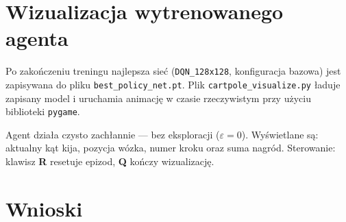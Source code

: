 \documentclass[12pt,a4paper]{article}
\begin{document}
\section{Wizualizacja wytrenowanego agenta}

Po zakończeniu treningu najlepsza sieć (\texttt{DQN\_128x128}, konfiguracja bazowa)
jest zapisywana do pliku \texttt{best\_policy\_net.pt}.
Plik \texttt{cartpole\_visualize.py} ładuje zapisany model i uruchamia
animację w czasie rzeczywistym przy użyciu biblioteki \texttt{pygame}.

Agent działa czysto zachłannie — bez eksploracji ($\varepsilon = 0$).
Wyświetlane są: aktualny kąt kija, pozycja wózka, numer kroku
oraz suma nagród. Sterowanie: klawisz \textbf{R} resetuje epizod,
\textbf{Q} kończy wizualizację.

\section{Wnioski}
\end{document}
